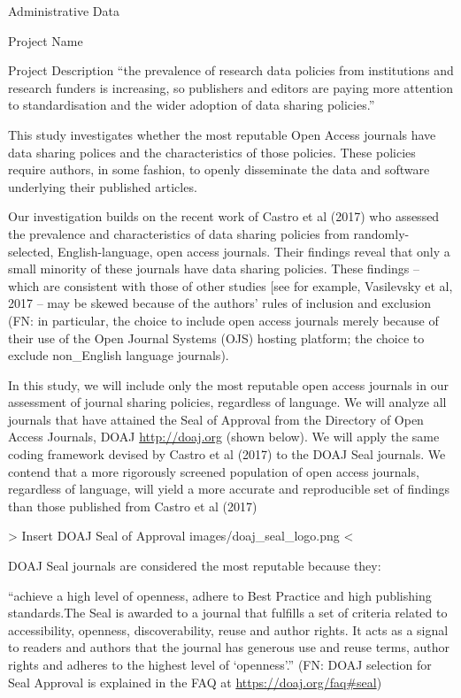 \documentclass[ignorenonframetext,]{beamer}
\begin{document}
\begin{frame}{Administrative Data}
\begin{block}{Project Name}
\begin{block}{Project Description}
``the prevalence of research data policies from institutions and
research funders is increasing, so publishers and editors are paying
more attention to standardisation and the wider adoption of data sharing
policies.''

This study investigates whether the most reputable Open Access journals
have data sharing polices and the characteristics of those policies.
These policies require authors, in some fashion, to openly disseminate
the data and software underlying their published articles.

Our investigation builds on the recent work of Castro et al (2017) who
assessed the prevalence and characteristics of data sharing policies
from randomly-selected, English-language, open access journals. Their
findings reveal that only a small minority of these journals have data
sharing policies. These findings -- which are consistent with those of
other studies {[}see for example, Vasilevsky et al, 2017 -- may be
skewed because of the authors' rules of inclusion and exclusion (FN: in
particular, the choice to include open access journals merely because of
their use of the Open Journal Systems (OJS) hosting platform; the choice
to exclude non\_English language journals).

In this study, we will include only the most reputable open access
journals in our assessment of journal sharing policies, regardless of
language. We will analyze all journals that have attained the Seal of
Approval from the Directory of Open Access Journals, DOAJ
\url{http://doaj.org} (shown below). We will apply the same coding
framework devised by Castro et al (2017) to the DOAJ Seal journals. We
contend that a more rigorously screened population of open access
journals, regardless of language, will yield a more accurate and
reproducible set of findings than those published from Castro et al
(2017)

\textbar{}\textbar{}\textgreater{} Insert DOAJ Seal of Approval
images/doaj\_seal\_logo.png \textless{}\textbar{}\textbar{}

DOAJ Seal journals are considered the most reputable because they:

``achieve a high level of openness, adhere to Best Practice and high
publishing standards.The Seal is awarded to a journal that fulfills a
set of criteria related to accessibility, openness, discoverability,
reuse and author rights. It acts as a signal to readers and authors that
the journal has generous use and reuse terms, author rights and adheres
to the highest level of `openness'.'' (FN: DOAJ selection for Seal
Approval is explained in the FAQ at \url{https://doaj.org/faq\#seal})


\end{block}
\end{block}
\end{frame}
\end{document}

